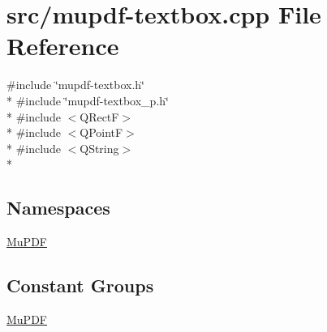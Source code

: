 \hypertarget{mupdf-textbox_8cpp}{\section{src/mupdf-\/textbox.cpp File Reference}
\label{mupdf-textbox_8cpp}
}
{\ttfamily \#include \char`\"{}mupdf-\/textbox.\-h\char`\"{}}\\*
{\ttfamily \#include \char`\"{}mupdf-\/textbox\-\_\-p.\-h\char`\"{}}\\*
{\ttfamily \#include $<$Q\-Rect\-F$>$}\\*
{\ttfamily \#include $<$Q\-Point\-F$>$}\\*
{\ttfamily \#include $<$Q\-String$>$}\\*
\subsection*{Namespaces}
\begin{DoxyCompactItemize}
\item 
\hyperlink{namespace_mu_p_d_f}{Mu\-P\-D\-F}
\end{DoxyCompactItemize}
\subsection*{Constant Groups}
\begin{DoxyCompactItemize}
\item 
\hyperlink{namespace_mu_p_d_f}{Mu\-P\-D\-F}
\end{DoxyCompactItemize}
